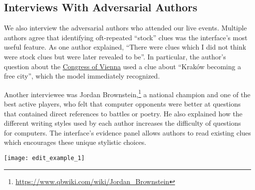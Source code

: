 \subsection{Interviews With Adversarial Authors}

We also interview the adversarial authors who attended our live events. Multiple authors agree that identifying oft-repeated ``stock'' clues was the interface's most useful feature. As one author explained, ``There were clues which I did not think were stock clues but were later revealed to be''. In particular, the author's question about the \underline{Congress of Vienna} used a clue about ``Krak\'ow becoming a free city'', which the model immediately recognized.

Another interviewee was Jordan Brownstein,\footnote{\url{https://www.qbwiki.com/wiki/Jordan_Brownstein}} a national \qb{} champion and one of the best active players, who felt that computer opponents were better at questions that contained direct references to battles or poetry. He also explained how the different writing styles used by each \qb{} author increases the difficulty of questions for computers. The interface's evidence panel allows authors to read existing clues which encourages these unique stylistic choices.

\begin{figure*}
\centering
\texttt{[image: edit\_example\_1]}
\caption{The \emph{Question Length} and the
  position where the model is first correct (\textit{Buzzing
    Position}, lower is better) are shown as a question is written. In (\textbf{1}), the author makes a
  mistake by removing a sentence that makes the question easier for the  model. In
  (\textbf{2}), the author uses the interpretation, replacing the
  highlighted word (shown in bold) ``molecules'' with ``species'' to trick
  the  model.}
\label{fig:edit_example_1}
\end{figure*}